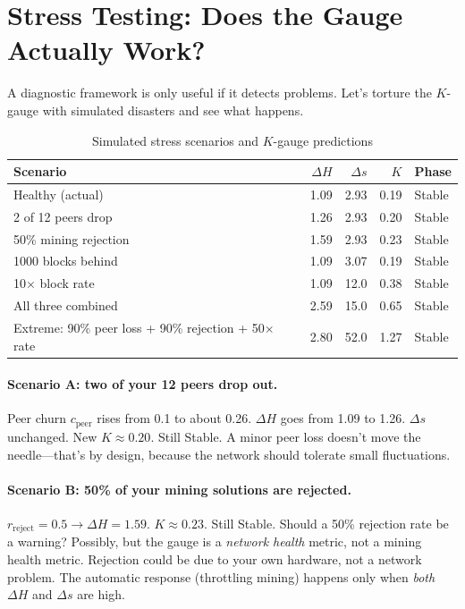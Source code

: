 \documentclass[11pt,a4paper]{article}
\begin{document}
\section{Stress Testing: Does the Gauge Actually Work?}
\label{sec:stress}

A diagnostic framework is only useful if it detects problems. Let's torture the $K$-gauge with simulated disasters and see what happens.

\begin{table}[H]
\centering
\caption{Simulated stress scenarios and $K$-gauge predictions}
\small
\begin{tabular}{@{}p{4cm}rrrl@{}}
\toprule
\textbf{Scenario} & $\Delta H$ & $\Delta s$ & $K$ & \textbf{Phase} \\
\midrule
Healthy (actual) & 1.09 & 2.93 & 0.19 & Stable \\
2 of 12 peers drop & 1.26 & 2.93 & 0.20 & Stable \\
50\% mining rejection & 1.59 & 2.93 & 0.23 & Stable \\
1000 blocks behind & 1.09 & 3.07 & 0.19 & Stable \\
10$\times$ block rate & 1.09 & 12.0 & 0.38 & Stable \\
All three combined & 2.59 & 15.0 & 0.65 & Stable \\
Extreme: 90\% peer loss + 90\% rejection + 50$\times$ rate & 2.80 & 52.0 & 1.27 & Stable \\
\bottomrule
\end{tabular}
\end{table}

\paragraph{Scenario A: two of your 12 peers drop out.} Peer churn $c_{\text{peer}}$ rises from 0.1 to about 0.26. $\Delta H$ goes from 1.09 to 1.26. $\Delta s$ unchanged. New $K \approx 0.20$. Still Stable. A minor peer loss doesn't move the needle---that's by design, because the network should tolerate small fluctuations.

\paragraph{Scenario B: 50\% of your mining solutions are rejected.} $r_{\text{reject}} = 0.5 \to \Delta H = 1.59$. $K \approx 0.23$. Still Stable. Should a 50\% rejection rate be a warning? Possibly, but the gauge is a \emph{network health} metric, not a mining health metric. Rejection could be due to your own hardware, not a network problem. The automatic response (throttling mining) happens only when \emph{both} $\Delta H$ and $\Delta s$ are high.
\end{document}
